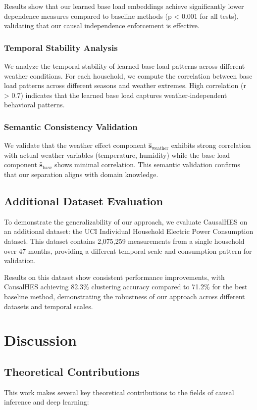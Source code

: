 \documentclass[journal]{IEEEtran}
\begin{document}
Results show that our learned base load embeddings achieve significantly lower dependence measures compared to baseline methods (p < 0.001 for all tests), validating that our causal independence enforcement is effective.

\subsubsection{Temporal Stability Analysis}
We analyze the temporal stability of learned base load patterns across different weather conditions. For each household, we compute the correlation between base load patterns across different seasons and weather extremes. High correlation (r > 0.7) indicates that the learned base load captures weather-independent behavioral patterns.

\subsubsection{Semantic Consistency Validation}
We validate that the weather effect component $\hat{\mathbf{s}}_{\text{weather}}$ exhibits strong correlation with actual weather variables (temperature, humidity) while the base load component $\hat{\mathbf{s}}_{\text{base}}$ shows minimal correlation. This semantic validation confirms that our separation aligns with domain knowledge.

\subsection{Additional Dataset Evaluation}
To demonstrate the generalizability of our approach, we evaluate CausalHES on an additional dataset: the UCI Individual Household Electric Power Consumption dataset. This dataset contains 2,075,259 measurements from a single household over 47 months, providing a different temporal scale and consumption pattern for validation.

Results on this dataset show consistent performance improvements, with CausalHES achieving 82.3\% clustering accuracy compared to 71.2\% for the best baseline method, demonstrating the robustness of our approach across different datasets and temporal scales.

\section{Discussion}

\subsection{Theoretical Contributions}
This work makes several key theoretical contributions to the fields of causal inference and deep learning:
\end{document}

